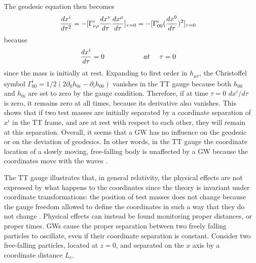\documentclass[binding=0.6cm, LaM]{sapthesis}
\begin{document}
	The geodesic equation then becomes
        \begin{equation}
          {{dx^i}\over{d\tau^2}} = -[\Gamma^i_{\nu\rho}{{dx^{\nu}}\over{d\tau}}{{dx^{\rho}}\over{d\tau}}]_{\tau=0} \\ 
          = - [ \Gamma^i_{00}({{dx^0}\over{d\tau}})^2]_{\tau=0}
        \end{equation}
        because
        \begin{equation}
          {{dx^i}\over{d\tau}} = 0 \hspace*{2cm} at \hspace*{0.5cm}\tau = 0
        \end{equation}
        since the mass is initially at rest. Expanding to first order in $h_{\mu\nu}$,
        the Christoffel symbol $\Gamma^i_{00} = 1/2(2\partial_{0}h_{0i} - \partial_i h_{00})$ vanishes in the TT gauge
        because both $h_{00}$ and $h_{0i}$ are set to zero by the gauge condition.
        Therefore, if at time $\tau = 0$ $dx^i/d\tau$ is zero, it remains zero at all times,
        because its derivative also vanishes.
        This shows that if two test masses are initially separated by a coordinate separation of $x^i$ in the TT frame,
        and are at rest with respect to each other, they will remain at this separation.
        Overall, it seems that a GW has no influence on the geodesic or on the deviation of geodesics. 
        In other words, in the TT gauge the coordinate location of a slowly moving, free-falling body is unaffected
        by a GW because the coordinates move with the waves \cite{4}.

        The TT gauge illustrates that, in general relativity, the physical effects are not expressed by what happens
        to the coordinates since the theory is invariant under coordinate transformations:
        the position of test masses does not change because the gauge freedom allowed to define the coordinates
        in such a way that they do not change \cite{3}.
        Physical effects can instead be found monitoring proper distances, or proper times. 
        GWs cause the proper separation between two freely falling particles to oscillate,
        even if their coordinate separation is constant. Consider two  free-falling particles,
        located at $z = 0$, and separated on the $x$ axis by a coordinate distance $L_c$.
\end{document}
